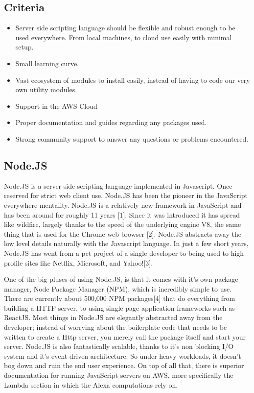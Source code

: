 \documentclass[onecolumn, draftclsnofoot,10pt, compsoc]{IEEEtran}
\begin{document}
    \subsection{Criteria}
        \begin{itemize}
            \item Server side scripting language should be flexible and robust enough to be used everywhere. From local machines, to cloud use easily with minimal setup. 
            \item Small learning curve.
            \item  Vast ecosystem of modules to install easily, instead of having to code our very own utility modules. 
            \item Support in the AWS Cloud
            \item Proper documentation and guides regarding any packages used. 
            \item Strong community support to answer any questions or problems encountered. 
        \end{itemize}
    \subsection{Node.JS}
        Node.JS is a server side scripting language implemented in Javascript. Once reserved for strict web client use, Node.JS has been the pioneer in the JavaScript everywhere mentality. Node.JS is a relatively new framework in JavaScript and has been around for roughly 11 years [1]. Since it was introduced it has spread like wildfire, largely thanks to the speed of the underlying engine V8, the same thing that is used for the Chrome web browser [2]. Node.JS abstracts away the low level details naturally with the Javascript language. In just a few short years, Node.JS has went from a pet project of a single developer to being used to high profile sites like Netflix, Microsoft, and Yahoo![3]. 

        One of the big pluses of using Node.JS, is that it comes with it’s own package manager, Node Package Manager (NPM), which is incredibly simple to use. There are currently about 500,000 NPM packages[4] that do everything from building a HTTP server, to using single page application frameworks such as ReactJS. Most things in Node.JS are elegantly abstracted away from the developer; instead of worrying about the boilerplate code that needs to be written to create a Http server, you merely call the package itself and start your server. Node.JS is also fantastically scalable, thanks to it’s non blocking I/O system and it’s event driven architecture. So under heavy workloads, it doesn’t bog down and ruin the end user experience. On top of all that, there is superior documentation for running JavaScript servers on AWS, more specifically the Lambda section in which the Alexa computations rely on. 
\end{document}
